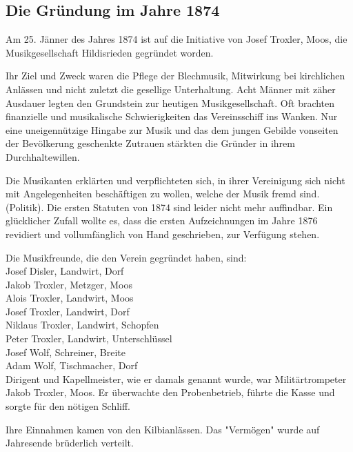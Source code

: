\begin{multicols}{2}

    \subsection{Die Gründung im Jahre 1874}

    Am 25. Jänner des Jahres 1874 ist auf die Initiative
    von Josef Troxler, Moos, die Musikgesellschaft Hildisrieden
    gegründet worden.

    Ihr Ziel und Zweck waren
    die Pflege der Blechmusik, Mitwirkung bei kirchlichen
    Anlässen und nicht zuletzt die gesellige Unterhaltung.
    Acht Männer mit zäher Ausdauer legten den
    Grundstein zur heutigen Musikgesellschaft. Oft brachten finanzielle und musikalische
    Schwierigkeiten das Vereinsschiff ins Wanken.
    Nur eine uneigennützige Hingabe zur Musik und das
    dem jungen Gebilde vonseiten der Bevölkerung geschenkte
    Zutrauen stärkten die Gründer in ihrem
    Durchhaltewillen.

    Die Musikanten erklärten und verpflichteten sich,
    in ihrer Vereinigung sich nicht mit Angelegenheiten
    beschäftigen zu wollen, welche der Musik fremd sind.
    (Politik). Die ersten Statuten von 1874 sind leider
    nicht mehr auffindbar. Ein glücklicher Zufall wollte
    es, dass die ersten Aufzeichnungen im Jahre 1876 revidiert
    und vollumfänglich von Hand geschrieben, zur
    Verfügung stehen.

    Die Musikfreunde, die den Verein gegründet haben, sind:\\

    \noindent
    Josef Disler, Landwirt, Dorf\\
    Jakob Troxler, Metzger, Moos\\
    Alois Troxler, Landwirt, Moos\\
    Josef Troxler, Landwirt, Dorf\\
    Niklaus Troxler, Landwirt, Schopfen\\
    Peter Troxler, Landwirt, Unterschlüssel\\
    Josef Wolf, Schreiner, Breite\\
    Adam Wolf, Tischmacher, Dorf\\


    Dirigent und Kapellmeister, wie er damals genannt
    wurde, war Militärtrompeter Jakob Troxler, Moos.
    Er überwachte den Probenbetrieb, führte die Kasse
    und sorgte für den nötigen Schliff.

    Ihre Einnahmen kamen von den Kilbianlässen. Das
    "Vermögen" wurde auf Jahresende brüderlich verteilt.

\end{multicols}

